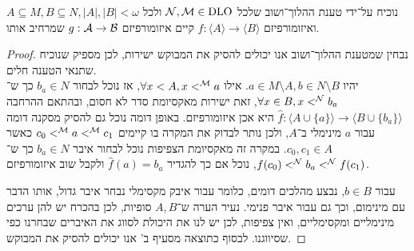 \subquestion{}
נוכיח על־ידי טענת ההלוך־ושוב שלכל $\mathcal{N}, \mathcal{M} \in \operatorname{DLO}$ ולכל $A \subseteq M, B \subseteq N, |A|, |B| < \omega$ ואיזומורפיזם $f : \langle A \rangle \to \langle B \rangle$ קיים איזומורפיזם $g : \mathcal{A} \to \mathcal{B}$ שמרחיב אותו.
\begin{proof}
	נבחין שמטענת ההלוך־ושוב אנו יכולים להסיק את המבוקש ישירות, לכן מספיק שנוכיח שתנאי הטענה חלים. \\
	יהיו $a \in M \setminus A, b \in N \setminus B$.
	אילו $\forall x < A, x <^{\mathcal{M}} a$, אז נוכל לבחור $b_a \in N$ כך ש־$\forall x \in B, x <^{\mathcal{N}} b_a$, זאת ישירות מאקסיומת סדר לא חסום,
	ובהתאם ההרחבה $\hat{f} : \langle A \cup \{ a \} \rangle \to \langle B \cup \{ b_a \}\rangle$ היא אכן איזומורפיזם.
	באופן דומה נוכל גם להסיק מסקנה דומה עבור $a$ מינימלי ב־$A$, ולכן נותר לבדוק את המקרה בו קיימים $c_0 <^{\mathcal{M}} a <^{\mathcal{M}} c_1$ כאשר $c_0, c_1 \in A$.
	במקרה זה מאקסיומת הצפיפות נוכל לבחור איבר $b_a \in N$ כך ש־$f(c_0) <^{\mathcal{N}} b_a <^{\mathcal{N}} f(c_1)$, נוכל אם כך להגדיר $\hat{f}(a) = b_a$ ולקבל שוב איזומורפיזם.

	עבור $b \in B$, נבצע מהלכים דומים, כלומר עבור איבק מקסימלי נבחר איבר גדול, אותו הדבר עם מינימום, וכך גם עבור איבר פנימי.
	נעיר הערה ש־$A, B$ סופיות, לכן בהכרח יש להן ערכים מינימליים ומקסימליים, ואין צפיפות, לכן יש לנו את היכולת לסווג את האיברים שבחרנו כפי שסיווגנו.
	לבסוף כתוצאה מסעיף ב' אנו יכולים להסיק את המבוקש.
\end{proof}

